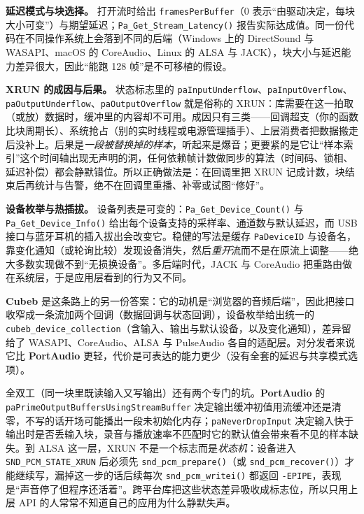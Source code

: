 \documentclass[12pt,a4paper,fontset=fandol]{ctexbook}
\newcommand{\Fn}[1]{\texttt{#1()}}
\newcommand{\Tp}[1]{\texttt{#1}}
\newcommand{\Bk}{\allowbreak}
\newcommand{\Lib}[1]{\textbf{#1}}
\begin{document}
\textbf{延迟模式与块选择。} 打开流时给出 \Tp{framesPerBuffer}（$0$ 表示``由驱动决定，每块大小可变''）与期望延迟；\Fn{Pa\_\Bk Get\_\Bk Stream\_\Bk Latency} 报告实际达成值。同一份代码在不同操作系统上会落到不同的后端（Windows 上的 DirectSound 与 WASAPI、macOS 的 CoreAudio、Linux 的 ALSA 与 JACK），块大小与延迟能力差异很大，因此``能跑 128 帧''是不可移植的假设。

\textbf{XRUN 的成因与后果。} 状态标志里的 \Tp{pa{\Bk}Input{\Bk}Underflow}、\Tp{pa{\Bk}Input{\Bk}Overflow}、\Tp{pa{\Bk}Output{\Bk}Underflow}、\Tp{pa{\Bk}Output{\Bk}Overflow} 就是俗称的 XRUN：库需要在这一拍取（或放）数据时，缓冲里的内容却不可用。成因只有三类——回调超支（你的函数比块周期长）、系统抢占（别的实时线程或电源管理插手）、上层消费者把数据搬走后没补上。后果是\emph{一段被替换掉的样本}，听起来是爆音；更要紧的是它让``样本索引''这个时间轴出现无声明的洞，任何依赖帧计数做同步的算法（时间码、锁相、延迟补偿）都会静默错位。所以正确做法是：在回调里把 XRUN 记成计数，块结束后再统计与告警，绝不在回调里重播、补零或试图``修好''。

\textbf{设备枚举与热插拔。} 设备列表是可变的：\Fn{Pa\_\Bk Get\_\Bk Device\_\Bk Count} 与 \Fn{Pa\_\Bk Get\_\Bk Device\_\Bk Info} 给出每个设备支持的采样率、通道数与默认延迟，而 USB 接口与蓝牙耳机的插入拔出会改变它。稳健的写法是缓存 \Tp{PaDeviceID} 与设备名，靠变化通知（或轮询比较）发现设备消失，然后\emph{重开}流而不是在原流上调整——绝大多数实现做不到``无损换设备''。多后端时代，JACK 与 CoreAudio 把重路由做在系统层，于是应用层看到的行为又不同。

\Lib{Cubeb} 是这条路上的另一份答案：它的动机是``浏览器的音频后端''，因此把接口收窄成一条流加两个回调（数据回调与状态回调），设备枚举给出统一的 \Tp{cubeb\_\Bk device\_\Bk collection}（含输入、输出与默认设备，以及变化通知），差异留给了 WASAPI、CoreAudio、ALSA 与 PulseAudio 各自的适配层。对分发者来说它比 \Lib{PortAudio} 更轻，代价是可表达的能力更少（没有全套的延迟与共享模式选项）。

全双工（同一块里既读输入又写输出）还有两个专门的坑。\Lib{PortAudio} 的 \Tp{pa\Bk Prime\Bk Output\Bk Buffers\Bk Using\Bk Stream\Bk Buffer} 决定输出缓冲初值用流缓冲还是清零，不写的话开场可能播出一段未初始化内存；\Tp{pa\Bk Never\Bk Drop\Bk Input} 决定输入快于输出时是否丢输入块，录音与播放速率不匹配时它的默认值会带来看不见的样本缺失。到 ALSA 这一层，XRUN 不是一个标志而是\emph{状态机}：设备进入 \Tp{SND\_\Bk PCM\_\Bk STATE\_\Bk XRUN} 后必须先 \Fn{snd\_\Bk pcm\_\Bk prepare}（或 \Fn{snd\_\Bk pcm\_\Bk recover}）才能继续写，漏掉这一步的话后续每次 \Fn{snd\_\Bk pcm\_\Bk writei} 都返回 \Tp{-EPIPE}，表现是``声音停了但程序还活着''。跨平台库把这些状态差异吸收成标志位，所以只用上层 API 的人常常不知道自己的应用为什么静默失声。
\end{document}
